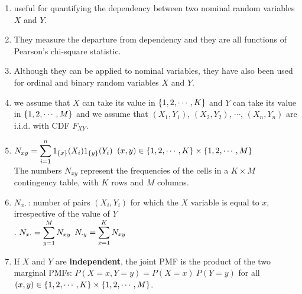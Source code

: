 \begin{enumerate}
    \item useful for quantifying the dependency between two nominal random variables $X$ and $Y$.
    \hfill \cite{statistics/book/Statistics-for-Data-Scientists/Maurits-Kaptein}

    \item They measure the departure from dependency and they are all functions of Pearson’s chi-square statistic.
    \hfill \cite{statistics/book/Statistics-for-Data-Scientists/Maurits-Kaptein}

    \item Although they can be applied to nominal variables, they have also been used for ordinal and binary random variables $X$ and $Y $.
    \hfill \cite{statistics/book/Statistics-for-Data-Scientists/Maurits-Kaptein}

    \item we assume that $X$ can take its value in $\left\{1, 2, \cdots  , K \right\}$ and $Y$ can take its value in $\left\{1, 2, \cdots  , M\right\}$ and we assume that $(X_1, Y_1)$, $(X_2, Y_2)$, $\cdots  $, $(X_n , Y_n )$ are i.i.d. with CDF $F_{X Y} $.
    \hfill \cite{statistics/book/Statistics-for-Data-Scientists/Maurits-Kaptein}

    \item
    $N_{x y} = \displaystyle\sum^n_{i=1} 1_{\left\{x\right\}}(X_i )1_{\left\{y\right\}}(Y_i )$
    \hfill
    $(x, y) \in \left\{1, 2, \cdots , K \right\} \times \left\{1, 2, \cdots , M\right\}$
    \hfill \cite{statistics/book/Statistics-for-Data-Scientists/Maurits-Kaptein}
    \\[0.3cm]
    The numbers $N_{x y}$ represent the frequencies of the cells in a $K × M$ contingency table, with $K$ rows and $M$ columns.
    \hfill \cite{statistics/book/Statistics-for-Data-Scientists/Maurits-Kaptein}

    \item $N_{x\cdot}$: number of pairs $(X_i , Y_i )$ for which the $X$ variable is equal to $x$, irrespective of the value of $Y$
    \hfill \cite{statistics/book/Statistics-for-Data-Scientists/Maurits-Kaptein}
    \\[0.3cm]
    .\hfill
    $N_{x\cdot} = \displaystyle\sum^M _{y=1} N_{x y}$
    \hfill
    $N_{\cdot y} = \displaystyle\sum^K _{x=1} N_{x y}$
    \hfill \cite{statistics/book/Statistics-for-Data-Scientists/Maurits-Kaptein}

    \item If $X$ and $Y$ are \textbf{independent}, the joint PMF is the product of the two marginal PMFs: $P(X = x, Y = y) = P(X = x)\ P(Y = y)$ for all $(x, y) \in \left\{1, 2, \cdots , K \right\} \times \left\{1, 2, \cdots , M\right\}$.
    \hfill \cite{statistics/book/Statistics-for-Data-Scientists/Maurits-Kaptein}


\end{enumerate}
